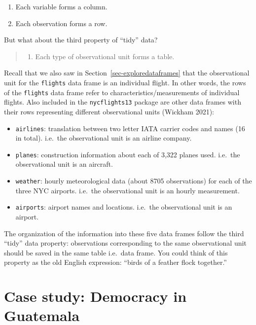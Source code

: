 \documentclass[
  letterpaper,
  DIV=11,
  numbers=noendperiod]{scrreprt}
\providecommand{\tightlist}{%
  \setlength{\itemsep}{0pt}\setlength{\parskip}{0pt}}\usepackage{longtable,booktabs,array}
\theoremstyle{definition}
\theoremstyle{remark}
\begin{document}
\begin{enumerate}
\def\labelenumi{\arabic{enumi}.}
\tightlist
\item
  Each variable forms a column.
\item
  Each observation forms a row.
\end{enumerate}

But what about the third property of ``tidy'' data?

\begin{quote}
\begin{enumerate}
\def\labelenumi{\arabic{enumi}.}
\setcounter{enumi}{2}
\tightlist
\item
  Each type of observational unit forms a table.
\end{enumerate}
\end{quote}

Recall that we also saw in Section~\ref{sec-exploredataframes} that the
observational unit for the \texttt{flights} data frame is an individual
flight. In other words, the rows of the \texttt{flights} data frame
refer to characteristics/measurements of individual flights. Also
included in the \texttt{nycflights13} package are other data frames with
their rows representing different observational units (Wickham 2021):

\begin{itemize}
\item
  \texttt{airlines}: translation between two letter IATA carrier codes
  and names (16 in total). i.e.~the observational unit is an airline
  company.
\item
  \texttt{planes}: construction information about each of 3,322 planes
  used. i.e.~the observational unit is an aircraft.
\item
  \texttt{weather}: hourly meteorological data (about 8705 observations)
  for each of the three NYC airports. i.e.~the observational unit is an
  hourly measurement.
\item
  \texttt{airports}: airport names and locations. i.e.~the observational
  unit is an airport.
\end{itemize}

The organization of the information into these five data frames follow
the third ``tidy'' data property: observations corresponding to the same
observational unit should be saved in the same table i.e.~data frame.
You could think of this property as the old English expression: ``birds
of a feather flock together.''

\hypertarget{sec-case-study-tidy}{%
\section{Case study: Democracy in Guatemala}\label{sec-case-study-tidy}}
\end{document}
